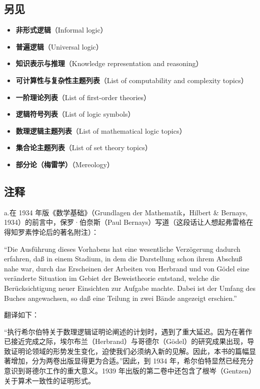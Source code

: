 \subsection{另见}
\begin{itemize}
  \item \textbf{非形式逻辑}（Informal logic）
  \item \textbf{普遍逻辑}（Universal logic）
  \item \textbf{知识表示与推理}（Knowledge representation and reasoning）
  \item \textbf{可计算性与复杂性主题列表}（List of computability and complexity topics）
  \item \textbf{一阶理论列表}（List of first-order theories）
  \item \textbf{逻辑符号列表}（List of logic symbols）
  \item \textbf{数理逻辑主题列表}（List of mathematical logic topics）
  \item \textbf{集合论主题列表}（List of set theory topics）
  \item \textbf{部分论（梅雷学）}（Mereology）
\end{itemize}
\subsection{注释}

a.在 1934 年版《数学基础》（Grundlagen der Mathematik，Hilbert \& Bernays, 1934）的前言中，保罗·伯奈斯（Paul Bernays）写道（这段话让人想起弗雷格在得知罗素悖论后的著名附注）：

  “Die Ausführung dieses Vorhabens hat eine wesentliche Verzögerung dadurch erfahren, daß in einem Stadium, in dem die Darstellung schon ihrem Abschuß nahe war, durch das Erscheinen der Arbeiten von Herbrand und von Gödel eine veränderte Situation im Gebiet der Beweistheorie entstand, welche die Berücksichtigung neuer Einsichten zur Aufgabe machte. Dabei ist der Umfang des Buches angewachsen, so daß eine Teilung in zwei Bände angezeigt erschien.”

  翻译如下：

  “执行希尔伯特关于数理逻辑证明论阐述的计划时，遇到了重大延迟。因为在著作已接近完成之际，埃尔布兰（Herbrand）与哥德尔（Gödel）的研究成果出现，导致证明论领域的形势发生变化，迫使我们必须纳入新的见解。因此，本书的篇幅显著增加，分为两卷出版显得更为合适。”因此，到 1934 年，希尔伯特显然已经充分意识到哥德尔工作的重大意义。1939 年出版的第二卷中还包含了根岑（Gentzen）关于算术一致性的证明形式。

